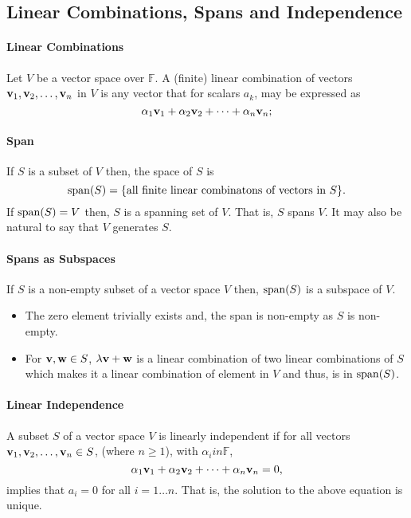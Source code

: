 \subsection{Linear Combinations, Spans and Independence}

\paragraph{Linear Combinations}
Let \(V\) be a vector space over \(\mathbb{F}\). A (finite)
linear combination of vectors \(\mathbf{v}_1, \mathbf{v}_2, \dots, \mathbf{v}_n\) in \(V\)
is any vector that for scalars \(a_k\), may be expressed as
\[
    \alpha_1\mathbf{v}_1 + \alpha_2\mathbf{v}_2 + \dots + \alpha_n\mathbf{v}_n;
\]

\paragraph{Span}
If \(S\) is a subset of \(V\) then, the space of \(S\) is
\[
    \mathrm{span}(S) = \{\text{all finite linear combinatons of vectors in \(S\)}\}.
\]
If \(\mathrm{span}(S) = V\) then, \(S\) is a spanning set of \(V\). That is,
\(S\) spans \(V\).
It may also be natural to say that \(V\) generates \(S\).

\paragraph{Spans as Subspaces}
If \(S\) is a non-empty subset of a vector space \(V\) then,
\(\mathrm{span}(S)\) is a subspace of \(V\).
\begin{itemize}
    \item The zero element trivially exists and, the span is non-empty as
    \(S\) is non-empty.
    \item For \(\mathbf{v}, \mathbf{w} \in S\), \(\lambda\mathbf{v} + \mathbf{w}\) is a linear combination
    of two linear combinations of \(S\) which makes it a linear combination of
    element in \(V\) and thus, is in \(\mathrm{span} (S)\).
\end{itemize}

\paragraph{Linear Independence}
A subset \(S\) of a vector space \(V\) is linearly independent
if for all vectors \(\mathbf{v}_1, \mathbf{v}_2, \dots ,\mathbf{v}_n\in S\), (where \(n\geq 1\)),
with \(\alpha_i in \mathbb{F}\),
\[
    \alpha_1 \mathbf{v}_1 + \alpha_2 \mathbf{v}_2 + \dots + \alpha_n \mathbf{v}_n = 0,
\]
implies that \(a_i = 0\)  for all \(i = 1\dots n\).
That is, the solution to the above equation is unique.

